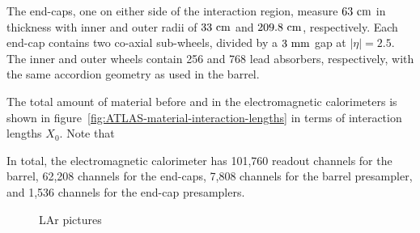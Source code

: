 The end-caps, one on either side of the interaction region, measure $63~\mathrm{cm}$ in thickness with inner and outer radii of $33~\mathrm{cm}$ and $209.8~\mathrm{cm}$, respectively. Each end-cap contains two co-axial sub-wheels, divided by a $3~\mathrm{mm}$ gap at $|\eta|=2.5$. The inner and outer wheels contain 256 and 768 lead absorbers, respectively, with the same accordion geometry as used in the barrel.

The total amount of material before and in the electromagnetic calorimeters is shown in figure~\ref{fig:ATLAS-material-interaction-lengths} in terms of interaction lengths $X_0$. Note that 

In total, the electromagnetic calorimeter has 101,760 readout channels for the barrel, 62,208 channels for the end-caps, 7,808 channels for the barrel presampler, and 1,536 channels for the end-cap presamplers. 

\begin{figure}
	LAr pictures
\end{figure}


